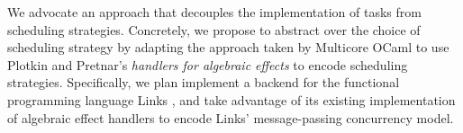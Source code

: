 \documentclass[preprint,10pt,numbers]{sigplanconf}
\begin{document}

We advocate an approach that decouples the implementation of tasks from scheduling strategies.
Concretely, we propose to abstract over the choice of scheduling strategy by adapting the approach taken by Multicore OCaml \cite{Dolan2015} to use Plotkin and Pretnar's \emph{handlers for algebraic effects} \cite{Plotkin2013} to encode scheduling strategies. Specifically, we plan implement a backend for the functional programming language Links \cite{Cooper2006}, and take advantage of its existing implementation of algebraic effect handlers \cite{Hillerstrom2015} to encode Links' message-passing concurrency model.



\end{document}
